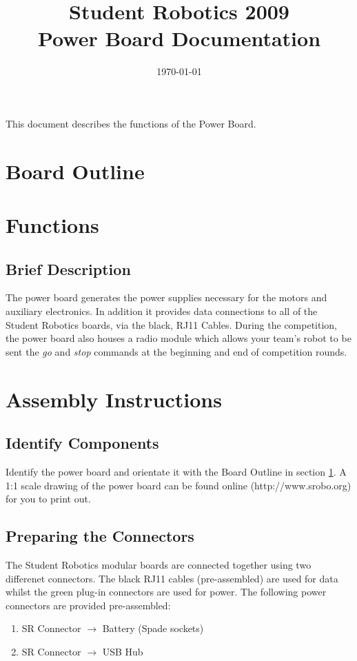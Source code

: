 \documentclass[a4paper, 12pt]{article}
\title {Student Robotics 2009\\ Power Board Documentation}
\date{\today}
\begin{document}
\maketitle

\noindent This document describes the functions of the Power Board. 

\section{Board Outline}
\label{sec:outline}

\section{Functions}
\subsection{Brief Description}
The power board generates the power supplies necessary for the motors and auxiliary electronics. In addition it provides data connections to all of the Student Robotics boards, via the black, RJ11 Cables. During the competition, the power board also houses a radio module which allows your team's robot to be sent the \textit{go} and \textit{stop} commands at the beginning and end of competition rounds.

\section{Assembly Instructions}
\subsection{Identify Components}
Identify the power board and orientate it with the Board Outline in section \ref{sec:outline}. A 1:1 scale drawing of the power board can be found online (http://www.srobo.org) for you to print out.

\subsection{Preparing the Connectors}
The Student Robotics modular boards are connected together using two differenet connectors. The black RJ11 cables (pre-assembled) are used for data whilst the green plug-in connectors are used for power. The following power connectors are provided pre-assembled:
\begin{enumerate}
\item SR Connector \(\rightarrow\) Battery (Spade sockets)
\item SR Connector \(\rightarrow\) USB Hub
\end{enumerate}
\end{document}
